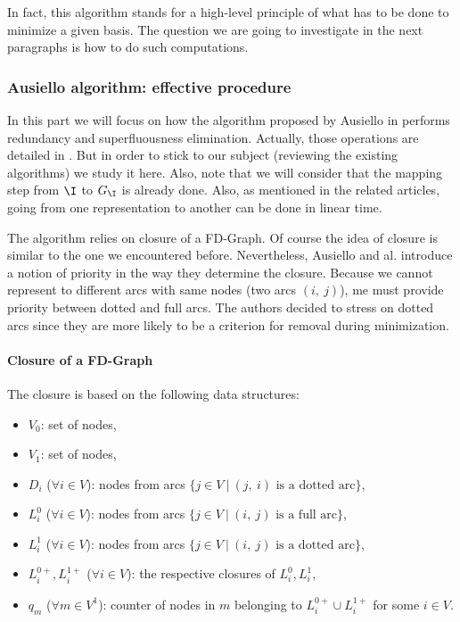 In fact, this algorithm stands for a high-level principle of what has to be done
to minimize a given basis. The question we are going to investigate in the next
paragraphs is how to do such computations.


\subsubsection{Ausiello algorithm: effective procedure}

In this part we will focus on how the algorithm proposed by Ausiello in 
\cite{ausiello_minimal_1986} performs redundancy and superfluousness 
elimination. Actually, those operations are detailed in 
\cite{ausiello_graph_1983}. But in order to stick to our subject (reviewing 
the existing algorithms) we study it here. Also, note that we will consider
that the mapping step from $\I$ to $G_{\I}$ is already done. Also, as mentioned
in the related articles, going from one representation to another can be done
in linear time.

\vspace{1.2em}

The algorithm relies on closure of a FD-Graph. Of course the idea of closure is
similar to the one we encountered before. Nevertheless, Ausiello and al. 
introduce a notion of priority in the way they determine the closure. Because
we cannot represent to different arcs with same nodes (two arcs $(i, \ j)$), me 
must provide priority between dotted and full arcs. The authors decided to 
stress on dotted arcs since they are more likely to be a criterion for removal 
during minimization.

\paragraph{Closure of a FD-Graph} The closure is based on the following data 
structures:
\begin{itemize}
	\item $V_0$: set of  nodes,
	\item $V_1$: set of  nodes,
	\item $D_i$ ($\forall i \in V$): nodes from  arcs
		$\{j \in V \ | \ (j, \  i) \text{ is a dotted arc} \}$,
	\item $L_{i}^0$ ($\forall i \in V$): nodes from  arcs
		$\{j \in V \ | \ (i, \  j) \text{ is a full arc} \}$,
	\item $L_{i}^1$ ($\forall i \in V$): nodes from  	
		arcs $\{j \in V \ | \ (i, \  j) \text{ is a dotted arc} \}$,
	\item $L_{i}^{0+}, L_{i}^{1+}$ ($\forall i \in V$): the respective closures
		of $L_i^0, L_i^1$,
	\item $q_m$ ($\forall m \in V^1$): counter of nodes in $m$ belonging to 
	$L_i^{0+} \cup L_i^{1+}$ for some $i \in V$.
\end{itemize}

